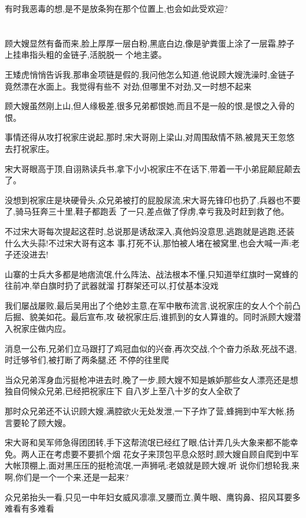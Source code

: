 ﻿\documentclass[12pt]{article}
\begin{document}
有时我恶毒的想,是不是放条狗在那个位置上,也会如此受欢迎?

\section{}

顾大嫂显然有备而来,脸上厚厚一层白粉,黑底白边,像是驴粪蛋上涂了一层霜,脖子上挂串指头粗的金链子,活脱脱一
个地主婆。

王矮虎悄悄告诉我,那串金项链是假的,我问他怎么知道,他说顾大嫂洗澡时,金链子竟然漂在水面上。我觉得有些不
对劲,但哪里不对劲,又一时想不起来

顾大嫂虽然刚上山,但人缘极差,很多兄弟都恨她,而且不是一般的恨,是恨之入骨的恨。

事情还得从攻打祝家庄说起,那时,宋大哥刚上梁山,对周围敌情不熟,被晁天王忽悠去打祝家庄。

宋大哥眼高于顶,自诩熟读兵书,拿下小小祝家庄不在话下,带着一干小弟屁颠屁颠去了。

没想到祝家庄是块硬骨头,众兄弟被打的屁股尿流,宋大哥先锋印也扔了,兵器也不要了,骑马狂奔三十里,鞋子都跑丢
了一只,差点做了俘虏,幸亏我及时赶到救了他。

不过宋大哥每次提起这茬时,总说那是诱敌深入,真他妈没意思,逃跑就是逃跑,还装什么大头蒜!不过宋大哥有这本
事,打死不认,那怕被人堵在被窝里,也会大喊一声:老子还没进去!

山寨的士兵大多都是地痞流氓,什么阵法、战法根本不懂,只知道举红旗时一窝蜂的往前冲,举白旗时扔了武器就溜
\dldots 打群架还可以,打仗基本没戏

我们屡战屡败,最后吴用出了个绝妙主意,在军中散布流言,说祝家庄的女人个个前凸后掘、貌美如花。最后宣布,攻
破祝家庄后,谁抓到的女人算谁的。同时派顾大嫂潜入祝家庄做内应。

消息一公布,兄弟们立马跟打了鸡冠血似的兴奋,再次交战,个个奋力杀敌,死战不退,时迁够爷们,被打断了两条腿,还
不停的往里爬\dldots

当众兄弟浑身血污挺枪冲进去时,晚了一步,顾大嫂不知是嫉妒那些女人漂亮还是想独自伺候众兄弟,已经把祝家庄下
自八岁上至八十岁的女人全砍了

那时众兄弟还不认识顾大嫂,满腔欲火无处发泄,一下子炸了营,蜂拥到中军大帐,扬言要轮了顾大嫂。

宋大哥和吴军师急得团团转,手下这帮流氓已经红了眼,估计弄几头大象来都不能幸免。两人正在考虑要不要抓个烟
花女子来顶包平息众怒时,顾大嫂自顾自爬到中军大帐顶棚上,面对黑压压的挺枪流氓,一声狮吼:老娘就是顾大嫂,听
说你们想轮我,来啊,你们是一个一个来,还是一起来?

众兄弟抬头一看,只见一中年妇女威风凛凛,叉腰而立,黄牛眼、鹰钩鼻、招风耳\dldots 要多难看有多难看
\end{document}
